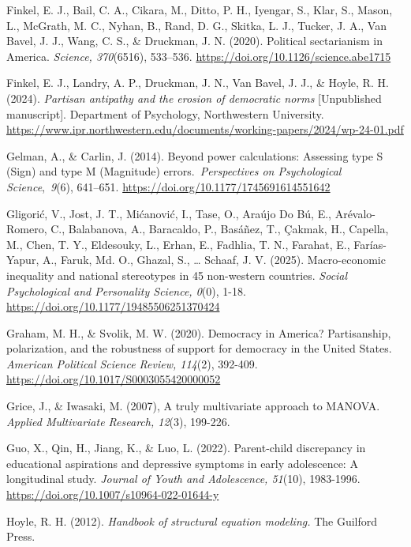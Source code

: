 \documentclass[authordate, meta]{jote-new-article}
\begin{document}
	Finkel, E. J., Bail, C. A., Cikara, M., Ditto, P. H., Iyengar, S., Klar, S., Mason, L., McGrath, M. C., Nyhan, B., Rand, D. G., Skitka, L. J., Tucker, J. A., Van Bavel, J. J., Wang, C. S., \& Druckman, J. N. (2020). Political sectarianism in America. \emph{Science, 370}(6516), 533--536. \url{https://doi.org/10.1126/science.abe1715}



	Finkel, E. J., Landry, A. P., Druckman, J. N., Van Bavel, J. J., \& Hoyle, R. H. (2024). \emph{Partisan antipathy and the erosion of democratic norms }[Unpublished manuscript]. Department of Psychology, Northwestern University. \url{https://www.ipr.northwestern.edu/documents/working-papers/2024/wp-24-01.pdf}



	Gelman, A., \& Carlin, J. (2014). Beyond power calculations: Assessing type S (Sign) and type M (Magnitude) errors. \emph{Perspectives on Psychological Science}, \emph{9}(6), 641--651. \url{https://doi.org/10.1177/1745691614551642}



	Gligorić, V., Jost, J. T., Mićanović, I., Tase, O., Araújo Do Bú, E., Arévalo-Romero, C., Balabanova, A., Baracaldo, P., Basáñez, T., Çakmak, H., Capella, M., Chen, T. Y., Eldesouky, L., Erhan, E., Fadhlia, T. N., Farahat, E., Farías-Yapur, A., Faruk, Md. O., Ghazal, S., … Schaaf, J. V. (2025). Macro-economic inequality and national stereotypes in 45 non-western countries. \emph{Social Psychological and Personality Science, 0}(0), 1-18. \url{https://doi.org/10.1177/19485506251370424}



	Graham, M. H., \& Svolik, M. W. (2020). Democracy in America? Partisanship, polarization, and the robustness of support for democracy in the United States. \emph{American Political Science Review, 114}(2), 392-409. \url{https://doi.org/10.1017/S0003055420000052}



	Grice, J., \& Iwasaki, M. (2007), A truly multivariate approach to MANOVA. \emph{Applied Multivariate Research, 12}(3), 199-226.



	Guo, X., Qin, H., Jiang, K., \& Luo, L. (2022). Parent-child discrepancy in educational aspirations and depressive symptoms in early adolescence: A longitudinal study. \emph{Journal of Youth and Adolescence, 51}(10), 1983-1996. \url{https://doi.org/10.1007/s10964-022-01644-y}


	Hoyle, R. H. (2012). \emph{Handbook of structural equation modeling. }The Guilford Press.
\end{document}
